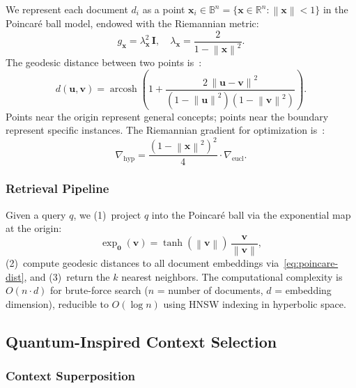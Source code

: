 \documentclass[journal]{IEEEtran}
\newcommand{\R}{\mathbb{R}}
\newcommand{\B}{\mathbb{B}}
\newcommand{\norm}[1]{\left\|#1\right\|}
\begin{document}
We represent each document $d_i$ as a point
$\mathbf{x}_i \in \B^n = \{\mathbf{x} \in \R^n : \norm{\mathbf{x}} < 1\}$
in the Poincar\'{e} ball model, endowed with the Riemannian metric:
\begin{equation}
  g_{\mathbf{x}} = \lambda_{\mathbf{x}}^{2}\,\mathbf{I}, \quad
  \lambda_{\mathbf{x}} = \frac{2}{1 - \norm{\mathbf{x}}^{2}}.
  \label{eq:conformal}
\end{equation}
The geodesic distance between two points
is~\cite{nickel2017poincare}:
\begin{equation}
  d(\mathbf{u}, \mathbf{v}) =
    \operatorname{arcosh}\!\left(
      1 + \frac{2\,\norm{\mathbf{u} - \mathbf{v}}^{2}}
               {(1 - \norm{\mathbf{u}}^{2})(1 - \norm{\mathbf{v}}^{2})}
    \right).
  \label{eq:poincare-dist}
\end{equation}
Points near the origin represent general concepts; points near the
boundary represent specific instances.
The Riemannian gradient for optimization
is~\cite{nickel2017poincare}:
\begin{equation}
  \nabla_{\mathrm{hyp}} =
    \frac{(1 - \norm{\mathbf{x}}^{2})^{2}}{4}
    \cdot \nabla_{\mathrm{eucl}}.
  \label{eq:riemannian-grad}
\end{equation}

\subsubsection{Retrieval Pipeline}

Given a query $q$, we (1)~project $q$ into the Poincar\'{e} ball via the
exponential map at the origin:
\begin{equation}
  \exp_{\mathbf{0}}(\mathbf{v}) =
    \tanh(\norm{\mathbf{v}})\,
    \frac{\mathbf{v}}{\norm{\mathbf{v}}},
  \label{eq:expmap}
\end{equation}
(2)~compute geodesic distances to all document embeddings
via~\eqref{eq:poincare-dist}, and
(3)~return the $k$ nearest neighbors.
The computational complexity is $O(n \cdot d)$ for brute-force search
($n$ = number of documents, $d$ = embedding dimension), reducible to
$O(\log n)$ using HNSW indexing in hyperbolic space.

\subsection{Quantum-Inspired Context Selection}
\label{sec:quantum}

\subsubsection{Context Superposition}
\end{document}
